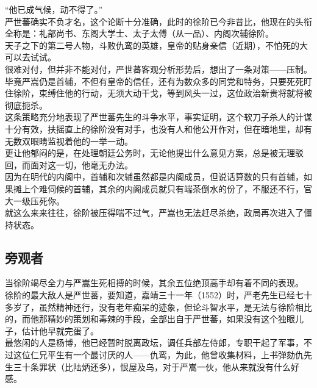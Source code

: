 \begin{multicols}{\theparacolNo}
“他已成气候，动不得了。”\\

严世蕃确实不负才名，这个论断十分准确，此时的徐阶已今非昔比，他现在的头衔全称是：礼部尚书、东阁大学士、太子太傅（从一品）、内阁次辅徐阶。\\

天子之下的第二号人物，斗败仇鸾的英雄，皇帝的贴身亲信（近期），不怕死的大可以去试试。\\

很难对付，但并非不能对付，严世蕃客观分析形势后，想出了一条对策——压制。\\

毕竟严嵩仍是首辅，不但有皇帝的信任，还有为数众多的同党和特务，只要死死盯住徐阶，束缚住他的行动，无须大动干戈，等到风头一过，这位政治新贵将就将被彻底扼杀。\\

这条策略充分地表现了严世蕃先生的斗争水平，事实证明，这个软刀子杀人的计谋十分有效，扶摇直上的徐阶没有对手，也没有人和他公开作对，但在暗地里，却有无数双眼睛监视着他的一举一动。\\

更让他郁闷的是，在处理朝廷公务时，无论他提出什么意见方案，总是被无理驳回，而面对这一切，他毫无办法。\\

因为在明代的内阁中，首辅和次辅虽然都是内阁成员，但说话算数的只有首辅，如果摊上个难伺候的首辅，其余的内阁成员就只有端茶倒水的份了，不服还不行，官大一级压死你。\\

就这么来来往往，徐阶被压得喘不过气，严嵩也无法赶尽杀绝，政局再次进入了僵持状态。\\

\subsection{旁观者}
当徐阶竭尽全力与严嵩生死相搏的时候，其余五位绝顶高手却有着不同的表现。\\

徐阶的最大敌人是严世蕃，要知道，嘉靖三十一年（1552）时，严老先生已经七十多岁了，虽然精神还行，没有老年痴呆的迹象，但论斗智水平，是无法与徐阶相比的，而他那精妙的策划和毒辣的手段，全部出自于严世蕃，如果没有这个独眼儿子，估计他早就完蛋了。\\

最悠闲的人是杨博，他已经暂时脱离政坛，调任兵部左侍郎，专职干起了军事，不过这位仁兄平生有一个最讨厌的人——仇鸾，为此，他曾收集材料，上书弹劾仇先生三十条罪状（比陆炳还多），恨屋及乌，对于严嵩一伙，他从来就没有什么好感。\\


\end{multicols}

